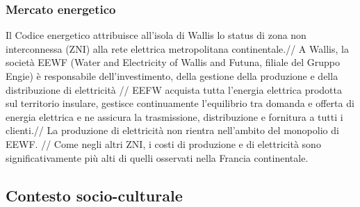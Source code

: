 \documentclass[fleqn,10pt]{SelfArx} %
\begin{document}
\subsubsection{Mercato energetico}
Il Codice energetico attribuisce all'isola di Wallis lo status di zona non interconnessa (ZNI) alla rete elettrica metropolitana continentale.//
A Wallis, la società EEWF (Water and Electricity of Wallis and Futuna, filiale del Gruppo Engie) è responsabile dell'investimento, della gestione della produzione e della distribuzione di elettricità //
EEFW acquista tutta l'energia elettrica prodotta sul territorio insulare, gestisce continuamente l'equilibrio tra domanda e offerta di energia elettrica e ne assicura la trasmissione, distribuzione e fornitura a tutti i clienti.//
La produzione di elettricità non rientra nell'ambito del monopolio di EEWF. //
Come negli altri ZNI, i costi di produzione e di elettricità sono significativamente più alti di quelli osservati nella Francia continentale.


\subsection{Contesto socio-culturale}
\end{document}
